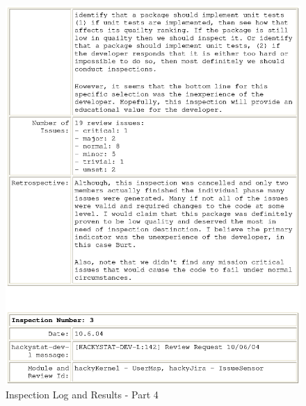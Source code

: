 \begin{figure}[htbp]
  \centering
  \includegraphics[width=1.0\textwidth]{figs/engineeringlog_word_html_4.eps}
  \caption{Inspection Log and Results - Part 4}
  \label{fig:log4}
\end{figure}

